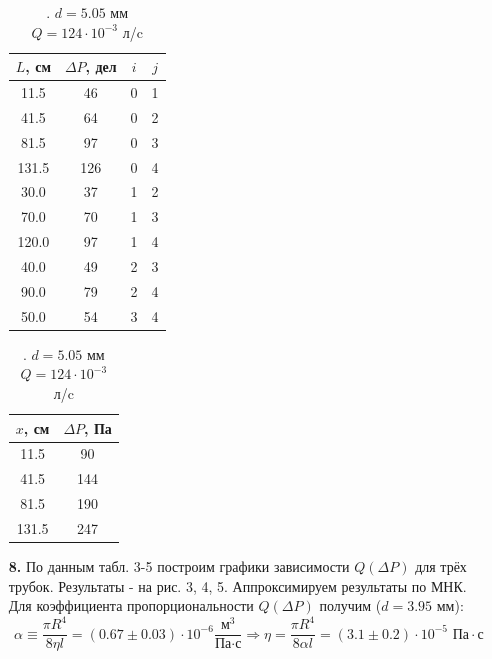 \documentclass[a4paper]{article}
\begin{document}
\begin{itemize}
\begin{table}[]
\begin{minipage}{0.49\linewidth}
\centering
\begin{tabular}{|c|c|c|c|}
\hline
$L$, см & $\Delta P$, дел & $i$ & $j$ \\ \hline
11.5    & 46              & 0   & 1   \\ \hline
41.5    & 64              & 0   & 2   \\ \hline
81.5    & 97              & 0   & 3   \\ \hline
131.5   & 126             & 0   & 4   \\ \hline
30.0    & 37              & 1   & 2   \\ \hline
70.0    & 70              & 1   & 3   \\ \hline
120.0   & 97              & 1   & 4   \\ \hline
40.0    & 49              & 2   & 3   \\ \hline
90.0    & 79              & 2   & 4   \\ \hline
50.0    & 54              & 3   & 4   \\ \hline
\end{tabular}
\caption{. \newline $d = 5.05$ мм \newline $Q = 124 \cdot 10^{-3} $ л/c}
\end{minipage}
\begin{minipage}{0.49\linewidth}
\centering
\begin{tabular}{|c|c|}
\hline
$x$, см & $\Delta P$, Па \\ \hline
11.5    & 90            \\ \hline
41.5    & 144           \\ \hline
81.5    & 190           \\ \hline
131.5   & 247           \\ \hline
\end{tabular}
\caption{. \newline $d = 5.05$ мм \newline $Q = 124 \cdot 10^{-3} $ л/c}
\end{minipage}
\end{table}
\item[\textbf{8. }] По данным табл. 3-5 построим графики зависимости $Q(\Delta P)$ для трёх трубок. Результаты - на рис. 3, 4, 5. Аппроксимируем результаты по МНК. Для коэффициента пропорциональности $Q(\Delta P)$ получим ($d = 3.95$ мм):
\[\alpha \equiv \frac{\pi R^4}{8 \eta l} = (0.67 \pm 0.03) \cdot 10^{-6} \frac{\text{м}^3}{\text{Па} \cdot \text{с}} \Rightarrow \eta = \frac{\pi R^4}{8 \alpha l} = (3.1 \pm 0.2) \cdot 10^{-5} \text{ Па} \cdot \text{с} \]


\end{itemize}
\end{document}
